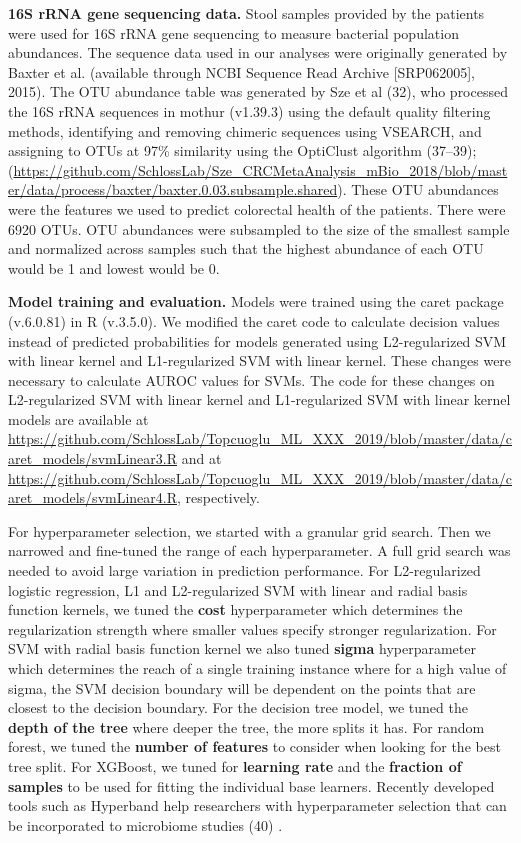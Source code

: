\documentclass[11pt,]{article}
\begin{document}
\textbf{16S rRNA gene sequencing data.} Stool samples provided by the
patients were used for 16S rRNA gene sequencing to measure bacterial
population abundances. The sequence data used in our analyses were
originally generated by Baxter et al. (available through NCBI Sequence
Read Archive {[}SRP062005{]}, 2015). The OTU abundance table was
generated by Sze et al (32), who processed the 16S rRNA sequences in
mothur (v1.39.3) using the default quality filtering methods,
identifying and removing chimeric sequences using VSEARCH, and assigning
to OTUs at 97\% similarity using the OptiClust algorithm (37--39);
(\url{https://github.com/SchlossLab/Sze_CRCMetaAnalysis_mBio_2018/blob/master/data/process/baxter/baxter.0.03.subsample.shared}).
These OTU abundances were the features we used to predict colorectal
health of the patients. There were 6920 OTUs. OTU abundances were
subsampled to the size of the smallest sample and normalized across
samples such that the highest abundance of each OTU would be 1 and
lowest would be 0.

\textbf{Model training and evaluation.} Models were trained using the
caret package (v.6.0.81) in R (v.3.5.0). We modified the caret code to
calculate decision values instead of predicted probabilities for models
generated using L2-regularized SVM with linear kernel and L1-regularized
SVM with linear kernel. These changes were necessary to calculate AUROC
values for SVMs. The code for these changes on L2-regularized SVM with
linear kernel and L1-regularized SVM with linear kernel models are
available at
\url{https://github.com/SchlossLab/Topcuoglu_ML_XXX_2019/blob/master/data/caret_models/svmLinear3.R}
and at
\url{https://github.com/SchlossLab/Topcuoglu_ML_XXX_2019/blob/master/data/caret_models/svmLinear4.R},
respectively.

For hyperparameter selection, we started with a granular grid search.
Then we narrowed and fine-tuned the range of each hyperparameter. A full
grid search was needed to avoid large variation in prediction
performance. For L2-regularized logistic regression, L1 and
L2-regularized SVM with linear and radial basis function kernels, we
tuned the \textbf{cost} hyperparameter which determines the
regularization strength where smaller values specify stronger
regularization. For SVM with radial basis function kernel we also tuned
\textbf{sigma} hyperparameter which determines the reach of a single
training instance where for a high value of sigma, the SVM decision
boundary will be dependent on the points that are closest to the
decision boundary. For the decision tree model, we tuned the
\textbf{depth of the tree} where deeper the tree, the more splits it
has. For random forest, we tuned the \textbf{number of features} to
consider when looking for the best tree split. For XGBoost, we tuned for
\textbf{learning rate} and the \textbf{fraction of samples} to be used
for fitting the individual base learners. Recently developed tools such
as Hyperband help researchers with hyperparameter selection that can be
incorporated to microbiome studies (40) .
\end{document}
